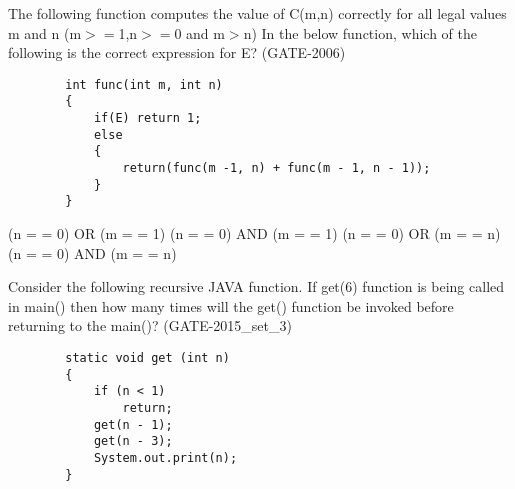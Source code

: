 

\begin{questyle}
  \question  The following function computes the value of C(m,n) correctly for all legal values m and n (m\(>=\)1,n\(>=\)0 and m\(>\)n)
            In the below function, which of the following is the correct expression for E? (GATE-2006)

    \begin{lstlisting}
        int func(int m, int n)
        {
            if(E) return 1;
            else
            {
                return(func(m -1, n) + func(m - 1, n - 1));
            }
        }
    \end{lstlisting}

  \begin{choices}
    \choice         (n = = 0) OR  (m = = 1)
    \choice         (n = = 0) AND (m = = 1)
    \CorrectChoice  (n = = 0) OR  (m = = n)
    \choice         (n = = 0) AND (m = = n)
  \end{choices}
\end{questyle}


\begin{questyle}
  \question  Consider the following recursive JAVA function. If get(6) function is being called in
            main() then how many times will the get() function be invoked before returning
            to the main()?   (GATE-2015\_set\_3)

        \begin{lstlisting}
        static void get (int n)
        {
            if (n < 1)
                return;
            get(n - 1);
            get(n - 3);
            System.out.print(n);
        }
        \end{lstlisting}

  \begin{choices}

  \end{choices}
\end{questyle}
